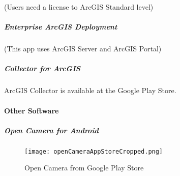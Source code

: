 {\normalsize (Users need a license to ArcGIS Standard level)}
\subparagraph{Enterprise ArcGIS Deployment}

{\normalsize (This app uses ArcGIS Server and ArcGIS Portal)}
\subparagraph{Collector for ArcGIS}ArcGIS Collector is available at the Google Play Store.

\paragraph{Other Software}
\subparagraph{Open Camera for Android}
\begin{figure}[h!]
\centering
    \texttt{[image: openCameraAppStoreCropped.png]}
\caption{Open Camera from Google Play Store}
\end{figure}

